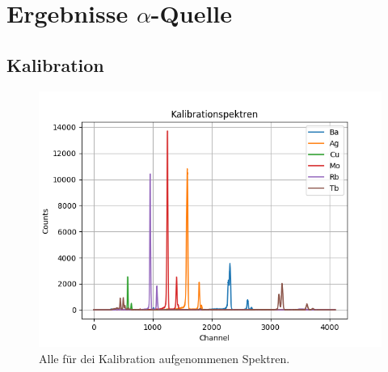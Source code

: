 \documentclass[12pt,a4paper]{article}
\begin{document}
\section{Ergebnisse $\alpha$-Quelle}
\subsection{Kalibration}

\begin{figure}
\centering
\includegraphics[scale=0.9]{Bilder/alpha/kal_alles.png}
\caption{Alle für dei Kalibration aufgenommenen Spektren.}
\label{fig:kal_alles}
\end{figure}
\end{document}
